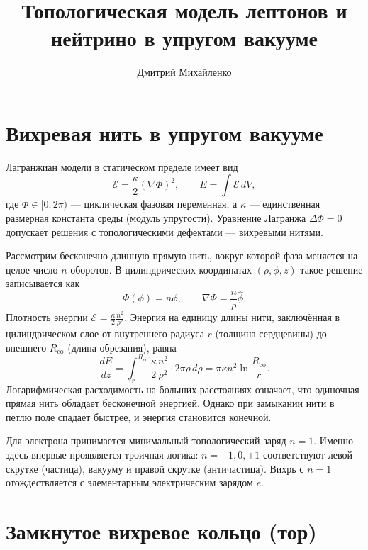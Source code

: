 \documentclass[12pt,a4paper]{article}
\title{Топологическая модель лептонов и нейтрино в упругом вакууме}
\author{Дмитрий Михайленко}
\date{}
\begin{document}
\maketitle

\section{Вихревая нить в упругом вакууме}

Лагранжиан модели в статическом пределе имеет вид
\begin{equation}
\mathcal{E} = \frac{\kappa}{2} (\nabla \Phi)^2, \qquad
E = \int \mathcal{E} \, dV,
\label{eq:lagrangian}
\end{equation}
где $\Phi \in [0, 2\pi)$ — циклическая фазовая переменная, а $\kappa$ — единственная размерная константа среды (модуль упругости). Уравнение Лагранжа $\Delta\Phi = 0$ допускает решения с топологическими дефектами — вихревыми нитями.

Рассмотрим бесконечно длинную прямую нить, вокруг которой фаза меняется на целое число $n$ оборотов. В цилиндрических координатах $(\rho, \phi, z)$ такое решение записывается как
\begin{equation}
\Phi(\phi) = n\phi, \qquad
\nabla\Phi = \frac{n}{\rho} \hat{\phi}.
\label{eq:vortex}
\end{equation}
Плотность энергии $\mathcal{E} = \frac{\kappa}{2} \frac{n^2}{\rho^2}$. Энергия на единицу длины нити, заключённая в цилиндрическом слое от внутреннего радиуса $r$ (толщина сердцевины) до внешнего $R_{\text{co}}$ (длина обрезания), равна
\begin{equation}
\frac{dE}{dz} = \int_{r}^{R_{\text{co}}}
\frac{\kappa}{2} \frac{n^2}{\rho^2} \cdot 2\pi\rho \, d\rho
= \pi \kappa n^2 \ln\frac{R_{\text{co}}}{r}.
\label{eq:energy_density}
\end{equation}
Логарифмическая расходимость на больших расстояниях означает, что одиночная прямая нить обладает бесконечной энергией. Однако при замыкании нити в петлю поле спадает быстрее, и энергия становится конечной.

Для электрона принимается минимальный топологический заряд $n = 1$. Именно здесь впервые проявляется троичная логика: $n = -1, 0, +1$ соответствуют левой скрутке (частица), вакууму и правой скрутке (античастица). Вихрь с $n = 1$ отождествляется с элементарным электрическим зарядом $e$.

\section{Замкнутое вихревое кольцо (тор)}
\end{document}
